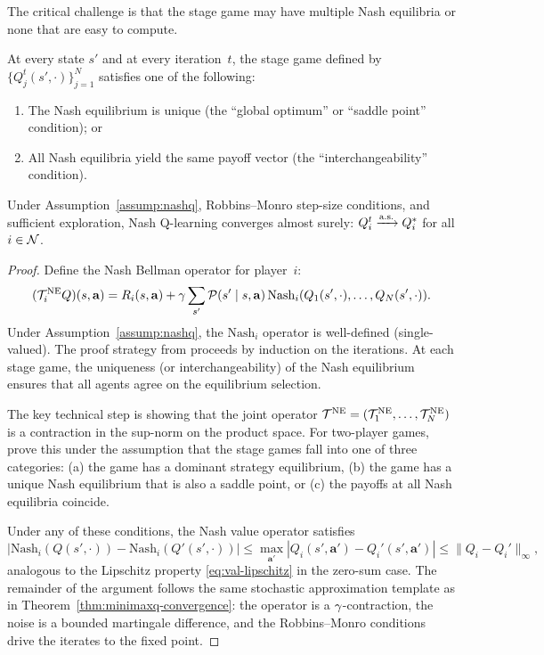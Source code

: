 \documentclass[11pt,a4paper]{article}
\begin{document}
The critical challenge is that the stage game may have multiple Nash
equilibria or none that are easy to compute.

\begin{assumption}
\label{assump:nashq}
At every state $s'$ and at every iteration~$t$, the stage game defined
by $\{Q_j^t(s', \cdot)\}_{j=1}^N$ satisfies one of the following:
\begin{enumerate}[label=(\alph*)]
  \item The Nash equilibrium is unique (the ``global optimum'' or
    ``saddle point'' condition); or
  \item All Nash equilibria yield the same payoff vector (the
    ``interchangeability'' condition).
\end{enumerate}
\end{assumption}

\begin{theorem}
\label{thm:nashq-convergence}
Under Assumption~\ref{assump:nashq}, Robbins--Monro step-size conditions,
and sufficient exploration, Nash Q-learning converges almost surely:
$Q_i^t \xrightarrow{\text{a.s.}} Q_i^*$ for all $i \in \mathcal{N}$.
\end{theorem}

\begin{proof}
Define the Nash Bellman operator for player~$i$:
\[
  (\mathcal{T}_i^{\mathrm{NE}} Q)(s, \mathbf{a})
  = R_i(s, \mathbf{a})
  + \gamma \sum_{s'} \mathcal{P}(s' \mid s, \mathbf{a})\,
    \mathrm{Nash}_i(Q_1(s', \cdot), \ldots, Q_N(s', \cdot)).
\]
Under Assumption~\ref{assump:nashq}, the $\mathrm{Nash}_i$ operator is
well-defined (single-valued).  The proof strategy from \citet{hu2003}
proceeds by induction on the iterations.  At each stage game, the
uniqueness (or interchangeability) of the Nash equilibrium ensures that
all agents agree on the equilibrium selection.

The key technical step is showing that the joint operator
$\mathcal{T}^{\mathrm{NE}} = (\mathcal{T}_1^{\mathrm{NE}}, \ldots, \mathcal{T}_N^{\mathrm{NE}})$ is a
contraction in the sup-norm on the product space.  For two-player games,
\citet{hu2003} prove this under the assumption that the stage games fall
into one of three categories: (a) the game has a dominant strategy
equilibrium, (b) the game has a unique Nash equilibrium that is also a
saddle point, or (c) the payoffs at all Nash equilibria coincide.

Under any of these conditions, the Nash value operator satisfies
\[
  |\mathrm{Nash}_i(Q(s', \cdot)) - \mathrm{Nash}_i(Q'(s', \cdot))|
  \le \max_{\mathbf{a}'} |Q_i(s', \mathbf{a}') - Q_i'(s', \mathbf{a}')|
  \le \|Q_i - Q_i'\|_\infty,
\]
analogous to the Lipschitz property \eqref{eq:val-lipschitz} in the
zero-sum case.  The remainder of the argument follows the same
stochastic approximation template as in
Theorem~\ref{thm:minimaxq-convergence}: the operator is a
$\gamma$-contraction, the noise is a bounded martingale difference,
and the Robbins--Monro conditions drive the iterates to the fixed point.
\end{proof}
\end{document}
